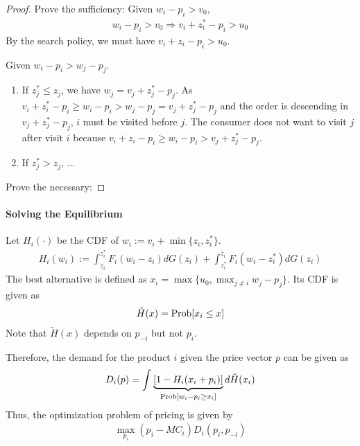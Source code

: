 \documentclass[11pt]{elegantbook}
\begin{document}
\begin{proof}
    Prove the sufficiency: Given $w_i-p_i> v_0$,
    \begin{equation}
        \begin{aligned}
            w_i-p_i> v_0 \Rightarrow v_i+z_i^*-p_i> u_0
        \end{aligned}
        \nonumber
    \end{equation}
    By the search policy, we must have $v_i+z_i-p_i>u_0$.

    Given $w_i-p_i>w_j-p_j$.
    \begin{enumerate}
        \item If $z_j^*\leq z_j$, we have $w_j=v_j+z_j^*-p_j$. As $v_i+z_i^*-p_i\geq w_i-p_i>w_j-p_j=v_j+z_j^*-p_j$ and the order is descending in $v_j+z_j^*-p_j$, $i$ must be visited before $j$. The consumer does not want to visit $j$ after visit $i$ because $v_i+z_i-p_i\geq w_i-p_i>v_j+z_j^*-p_j$.
        \item If $z_j^*>z_j$, ...
    \end{enumerate}
    Prove the necessary:
\end{proof}
\paragraph*{Solving the Equilibrium}
Let $H_i(\cdot)$ be the CDF of $w_i:=v_i+\min\{z_i,z_i^*\}$.
\begin{equation}
    \begin{aligned}
        H_i(w_i):=\int_{\underline{z}_i}^{z_i^*}F_i(w_i-z_i)d G(z_i)+\int_{z_i^*}^{\bar{z}_i}F_i(w_i-z_i^*)d G(z_i)
    \end{aligned}
    \nonumber
\end{equation}
The best alternative is defined as $x_i=\max\{u_0,\max_{j\neq i}w_j-p_j\}$. Its CDF is given as
\begin{equation}
    \begin{aligned}
        \tilde{H}(x)=\textnormal{Prob}[x_i\leq x]
    \end{aligned}
    \nonumber
\end{equation}
Note that $\tilde{H}(x)$ depends on $p_{-i}$ but not $p_i$.

Therefore, the demand for the product $i$ given the price vector $p$ can be given as
\begin{equation}
    \begin{aligned}
        D_i(p)=\int\underbrace{[1-H_i(x_i+p_i)]}_{\textnormal{Prob}[w_i-p_i\geq x_i]}d\tilde{H}(x_i)
    \end{aligned}
    \nonumber
\end{equation}
Thus, the optimization problem of pricing is given by
\begin{equation}
    \begin{aligned}
        \max_{p_i} (p_i-MC_i) D_i(p_i,p_{-i})
    \end{aligned}
    \nonumber
\end{equation}
\end{document}
